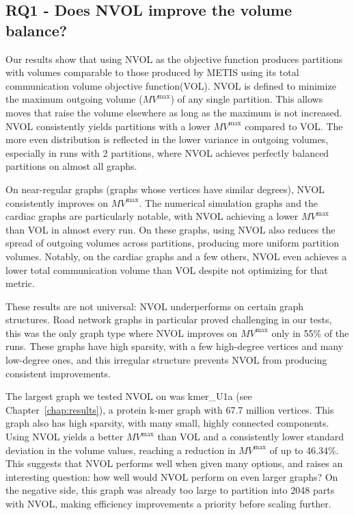 \subsection{RQ1 - Does NVOL improve the volume balance?}
Our results show that using NVOL as the objective function produces partitions with volumes comparable to those produced by METIS using its total communication volume objective function(VOL). NVOL is defined to minimize the maximum outgoing volume ($MV^{\mathrm{max}}$) of any single partition. This allows moves that raise the volume elsewhere as long as the maximum is not increased. NVOL consistently yields partitions with a lower $MV^{\mathrm{max}}$ compared to VOL. The more even distribution is reflected in the lower variance in outgoing volumes, especially in runs with 2 partitions, where NVOL achieves perfectly balanced partitions on almost all graphs.

On near-regular graphs (graphs whose vertices have similar degrees), NVOL consistently improves on $MV^{\mathrm{max}}$. The numerical simulation graphs and the cardiac graphs are particularly notable, with NVOL achieving a lower $MV^{\mathrm{max}}$ than VOL in almost every run. On these graphs, using NVOL also reduces the spread of outgoing volumes across partitions, producing more uniform partition volumes. Notably, on the cardiac graphs and a few others, NVOL even achieves a lower total communication volume than VOL despite not optimizing for that metric.

These results are not universal: NVOL underperforms on certain graph structures. Road network graphs in particular proved challenging in our tests, this was the only graph type where NVOL improves on $MV^{\mathrm{max}}$ only in 55\% of the runs. These graphs have high sparsity, with a few high-degree vertices and many low-degree ones, and this irregular structure prevents NVOL from producing consistent improvements.

The largest graph we tested NVOL on was kmer\_U1a (see Chapter~\ref{chap:results}), a protein k-mer graph with 67.7 million vertices. This graph also has high sparsity, with many small, highly connected components. Using NVOL yields a better $MV^{\mathrm{max}}$ than VOL and a consistently lower standard deviation in the volume values, reaching a reduction in $MV^{\mathrm{max}}$ of up to 46.34\%. This suggests that NVOL performs well when given many options, and raises an interesting question: how well would NVOL perform on even larger graphs? On the negative side, this graph was already too large to partition into 2048 parts with NVOL, making efficiency improvements a priority before scaling further.

